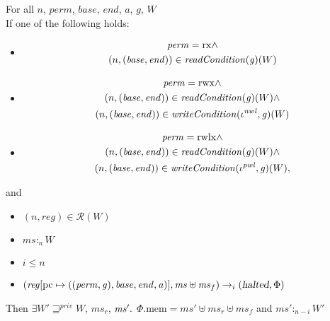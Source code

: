 \documentclass[a4paper]{article}
\newcommand{\update}[2]{[#1 \mapsto #2]}
\newcommand{\var}[1]{\mathit{#1}}
\newcommand{\hs}{\var{ms}}
\newcommand{\ms}{\hs}
\newcommand{\gl}{\var{g}}
\newcommand{\pcreg}{\mathrm{pc}}
\newcommand{\addr}{\var{a}}
\newcommand{\start}{\var{base}}
\newcommand{\addrend}{\var{end}}
\newcommand{\reg}{\var{reg}}
\newcommand{\heap}{\var{mem}}
\newcommand{\perm}{\var{perm}}
\newcommand{\nwl}{\var{nwl}}
\newcommand{\pwl}{\var{pwl}}
\newcommand{\plainproj}[1]{\mathrm{#1}}
\newcommand{\memheap}[1][\Phi]{#1.\plainproj{mem}}
\newcommand{\halted}{\textsl{halted}}
\newcommand{\plainfun}[2]{
  \ifthenelse{\equal{#2}{}}
  {\mathit{#1}}
  {\mathit{#1}(#2)}
}
\newcommand{\readCond}[1]{\plainfun{readCondition}{#1}}
\newcommand{\writeCond}[1]{\plainfun{writeCondition}{#1}}
\newcommand{\futurestr}{\mathbin{\sqsupseteq}^{\var{priv}}}
\newcommand{\heapSat}[3][\heap]{#1 :_{#2} #3}
\newcommand{\asmType}{\plaindom{AsmType}}
\newcommand{\plaindom}[1]{\mathrm{#1}}
\newcommand{\intr}[2]{\mathcal{#1}}
\newcommand{\regintr}[1]{\intr{R}{#1}}
\newcommand{\stdrr}{\regintr{\asmType}}
\newcommand{\npair}[2][n]{\left(#1,#2 \right)}
\newcommand{\plainperm}[1]{\mathrm{#1}}
\newcommand{\exec}{\plainperm{rx}}
\newcommand{\rwx}{\plainperm{rwx}}
\newcommand{\rwlx}{\plainperm{rwlx}}
\newcommand{\step}[1][]{\rightarrow_{#1}}
\begin{document}
\begin{lemma}
  \label{lem:ftlr-induction-helper}
  For all $n$, $\perm$, $\start$, $\addrend$, $\addr$, $\gl$, $W$  \\
  If one of the following holds:
  \begin{itemize}
  \item \[
      \begin{gathered}
        \perm = \exec \land\\
        \npair{(\start,\addrend)} \in \readCond{}(\gl)(W)
      \end{gathered}
    \]
  \item \[
      \begin{gathered}
        \perm = \rwx \land \\
        \npair{(\start,\addrend)} \in \readCond{}(\gl)(W) \land\\
        \npair{(\start,\addrend)} \in \writeCond{}(\iota^\nwl,\gl)(W)
      \end{gathered}
    \]
  \item \[
      \begin{gathered}
        \perm = \rwlx \land\\
        \npair{(\start,\addrend)} \in \readCond{}(\gl)(W) \land\\
        \npair{(\start,\addrend)} \in \writeCond{}(\iota^\pwl,\gl)(W),
      \end{gathered}
    \]
  \end{itemize}
  and
  \begin{itemize}
  \item $\npair[n]{\reg}\in \stdrr(W)$
  \item $\heapSat[\hs]{n}{W}$
  \item $i \leq n$
  \item $(\reg\update{\pcreg}{((\perm,\gl),\start,\addrend,\addr)},\hs \uplus \ms_f) \step[i] (\halted,\Phi)$
  \end{itemize}
  
  Then $\exists W' \futurestr W$, $\hs_r$, $\hs' \ldotp$
  $\memheap[\Phi] = \hs' \uplus \hs_r \uplus \ms_f$ and $\heapSat[\hs']{n-i}{W'}$
\end{lemma}
\end{document}
